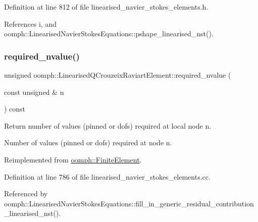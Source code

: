 Definition at line 812 of file linearised\+\_\+navier\+\_\+stokes\+\_\+elements.\+h.



References i, and oomph\+::\+Linearised\+Navier\+Stokes\+Equations\+::pshape\+\_\+linearised\+\_\+nst().

\mbox{\label{classoomph_1_1LinearisedQCrouzeixRaviartElement_afe21c0edebd508c2d88b515d18329727}} 
\subsubsection{\texorpdfstring{required\+\_\+nvalue()}{required\_nvalue()}}
{\footnotesize\ttfamily unsigned oomph\+::\+Linearised\+Q\+Crouzeix\+Raviart\+Element\+::required\+\_\+nvalue (\begin{DoxyParamCaption}\item[{const unsigned \&}]{n }\end{DoxyParamCaption}) const\hspace{0.3cm}{\ttfamily [virtual]}}



Return number of values (pinned or dofs) required at local node n. 

Number of values (pinned or dofs) required at node n. 

Reimplemented from \hyperlink{classoomph_1_1FiniteElement_a56610c60d5bc2d7c27407a1455471b1a}{oomph\+::\+Finite\+Element}.



Definition at line 786 of file linearised\+\_\+navier\+\_\+stokes\+\_\+elements.\+cc.



Referenced by oomph\+::\+Linearised\+Navier\+Stokes\+Equations\+::fill\+\_\+in\+\_\+generic\+\_\+residual\+\_\+contribution\+\_\+linearised\+\_\+nst().

\mbox{\label{classoomph_1_1LinearisedQCrouzeixRaviartElement_aedc60242b651d0b81350880ac6c5d603}} 
